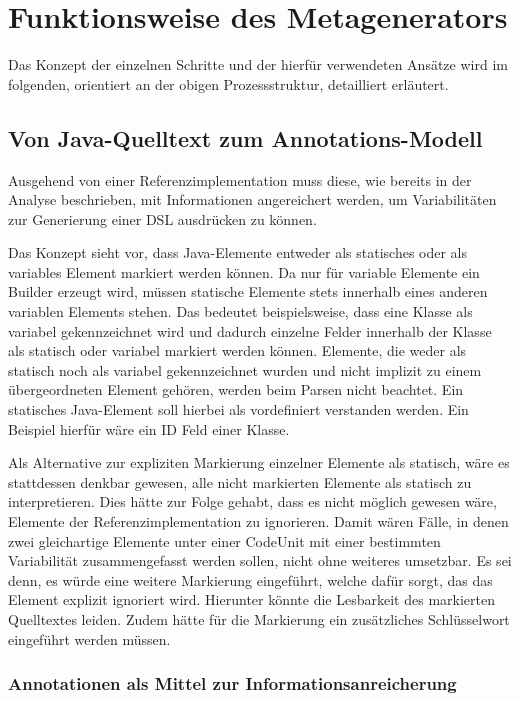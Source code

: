 \documentclass[12pt,oneside,a4paper,parskip]{scrbook}
\begin{document}
\section{Funktionsweise des Metagenerators}

Das Konzept der einzelnen Schritte und der hierfür verwendeten Ansätze wird im folgenden, orientiert an der obigen Prozessstruktur, detailliert erläutert.

\subsection{Von Java-Quelltext zum Annotations-Modell}\label{sec:sourcetomodel}

Ausgehend von einer Referenzimplementation muss diese, wie bereits in der Analyse beschrieben, mit Informationen angereichert werden, um Variabilitäten zur Generierung einer DSL ausdrücken zu können.

Das Konzept sieht vor, dass Java-Elemente entweder als statisches oder als variables Element markiert werden können. Da nur für variable Elemente ein Builder erzeugt wird, müssen statische Elemente stets innerhalb eines anderen variablen Elements stehen. Das bedeutet beispielsweise, dass eine Klasse als variabel gekennzeichnet wird und dadurch einzelne Felder innerhalb der Klasse als statisch oder variabel markiert werden können. Elemente, die weder als statisch noch als variabel gekennzeichnet wurden und nicht implizit zu einem übergeordneten Element gehören, werden beim Parsen nicht beachtet. Ein statisches Java-Element soll hierbei als vordefiniert verstanden werden. Ein Beispiel hierfür wäre ein ID Feld einer Klasse.

Als Alternative zur expliziten Markierung einzelner Elemente als statisch, wäre es stattdessen denkbar gewesen, alle nicht markierten Elemente als statisch zu interpretieren. Dies hätte zur Folge gehabt, dass es nicht möglich gewesen wäre, Elemente der Referenzimplementation zu ignorieren. Damit wären Fälle, in denen zwei gleichartige Elemente unter einer CodeUnit mit einer bestimmten Variabilität zusammengefasst werden sollen, nicht ohne weiteres umsetzbar. Es sei denn, es würde eine weitere Markierung eingeführt, welche dafür sorgt, das das Element explizit ignoriert wird. Hierunter könnte die Lesbarkeit des markierten Quelltextes leiden. Zudem hätte für die Markierung ein zusätzliches Schlüsselwort eingeführt werden müssen.

\subsubsection{Annotationen als Mittel zur Informationsanreicherung}
\end{document}
